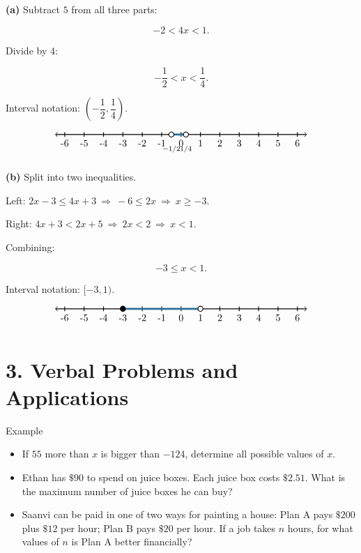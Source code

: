 \documentclass[12pt]{article}
\newcounter{examplenum}
\newenvironment{friendlyex}{%
    \refstepcounter{examplenum}%
    \begin{friendlyexbox}{Example \theexamplenum}%
}{%
    \end{friendlyexbox}%
}
\newcommand{\openpoint}[1]{
\draw[thick, fill=white] (#1,0) circle (0.13);
}
\newcommand{\closedpoint}[1]{
\draw[thick, fill=black] (#1,0) circle (0.13);
}
\begin{document}
\begin{solutionbox}
\textbf{(a)} Subtract $5$ from all three parts:

\[
-2<4x<1.
\]

Divide by $4$:

\[
-\frac12<x<\frac14.
\]

Interval notation: $\left(-\dfrac12,\dfrac14\right)$.

\[
\begin{tikzpicture}[scale=0.7]
    \draw[<->, thick] (-6.5,0) -- (6.5,0);
    \foreach \x in {-6,-5,-4,-3,-2,-1,0,1,2,3,4,5,6}
    {
        \draw[thick] (\x,0.12) -- (\x,-0.12);
        \node[below] at (\x,-0.12) {\x};
    }
    \draw[line width=2pt, primaryblue] (-0.5,0) -- (0.25,0);
    \openpoint{-0.5} \openpoint{0.25}
    \node[below] at (-0.5,-0.4) {\scriptsize $-1/2$};
    \node[below] at (0.25,-0.4) {\scriptsize $1/4$};
\end{tikzpicture}
\]

\textbf{(b)} Split into two inequalities.

Left: $2x-3\le 4x+3\ \Longrightarrow\ -6\le 2x\ \Longrightarrow\ x\ge -3$.

Right: $4x+3<2x+5\ \Longrightarrow\ 2x<2\ \Longrightarrow\ x<1$.

Combining:

\[
-3\le x<1.
\]

Interval notation: $[-3,1)$.

\[
\begin{tikzpicture}[scale=0.7]
    \draw[<->, thick] (-6.5,0) -- (6.5,0);
    \foreach \x in {-6,-5,-4,-3,-2,-1,0,1,2,3,4,5,6}
    {
        \draw[thick] (\x,0.12) -- (\x,-0.12);
        \node[below] at (\x,-0.12) {\x};
    }
    \draw[line width=2pt, primaryblue] (-3,0) -- (1,0);
    \closedpoint{-3} \openpoint{1}
\end{tikzpicture}
\]
\end{solutionbox}

  

\section*{3. Verbal Problems and Applications}

\begin{friendlyex}
\begin{itemize}
    \item[(a)] If $55$ more than $x$ is bigger than $-124$, determine all possible values of $x$.
    \item[(b)] Ethan has $\$90$ to spend on juice boxes. Each juice box costs $\$2.51$. What is the maximum number of juice boxes he can buy?
    \item[(c)] Saanvi can be paid in one of two ways for painting a house: Plan A pays $\$200$ plus $\$12$ per hour; Plan B pays $\$20$ per hour. If a job takes $n$ hours, for what values of $n$ is Plan A better financially?
\end{itemize}
\end{friendlyex}
\end{document}
